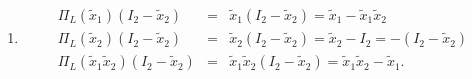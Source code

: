 \documentclass[aps,preprint]{revtex4}
\begin{document}
\begin{enumerate}
\item 
\begin{eqnarray}
\Pi _{L}\left( \widetilde{x}_{1}\right) \left( I_{2}-\widetilde{x}%
_{2}\right) &=&\widetilde{x}_{1}\left( I_{2}-\widetilde{x}_{2}\right) =%
\widetilde{x}_{1}-\widetilde{x}_{1}\widetilde{x}_{2} \\
\Pi _{L}\left( \widetilde{x}_{2}\right) \left( I_{2}-\widetilde{x}%
_{2}\right) &=&\widetilde{x}_{2}\left( I_{2}-\widetilde{x}_{2}\right) =%
\widetilde{x}_{2}-I_{2}=-\left( I_{2}-\widetilde{x}_{2}\right) \\
\Pi _{L}\left( \widetilde{x}_{1}\widetilde{x}_{2}\right) \left( I_{2}-%
\widetilde{x}_{2}\right) &=&\widetilde{x}_{1}\widetilde{x}_{2}\left( I_{2}-%
\widetilde{x}_{2}\right) =\widetilde{x}_{1}\widetilde{x}_{2}-\widetilde{x}%
_{1}.
\end{eqnarray}
\end{enumerate}
\end{document}
